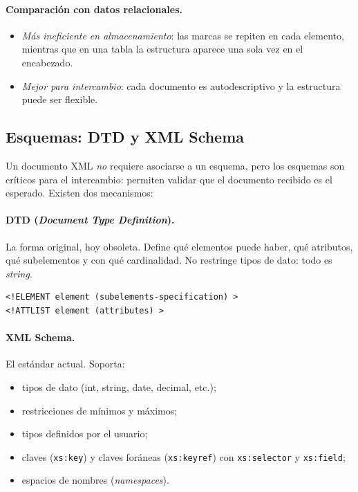 \documentclass[11pt,a4paper]{article}
\begin{document}
\paragraph{Comparación con datos relacionales.}
\begin{itemize}
    \item \emph{Más ineficiente en almacenamiento}: las marcas se repiten
    en cada elemento, mientras que en una tabla la estructura aparece
    una sola vez en el encabezado.
    \item \emph{Mejor para intercambio}: cada documento es
    autodescriptivo y la estructura puede ser flexible.
\end{itemize}

\subsection{Esquemas: DTD y XML Schema}

Un documento XML \emph{no} requiere asociarse a un esquema, pero los
esquemas son críticos para el intercambio: permiten validar que el
documento recibido es el esperado. Existen dos mecanismos:

\paragraph{DTD (\emph{Document Type Definition}).} La forma original,
hoy obsoleta. Define qué elementos puede haber, qué atributos, qué
subelementos y con qué cardinalidad. No restringe tipos de dato: todo
es \emph{string}.

\begin{lstlisting}
<!ELEMENT element (subelements-specification) >
<!ATTLIST element (attributes) >
\end{lstlisting}

\paragraph{XML Schema.} El estándar actual. Soporta:
\begin{itemize}
    \item tipos de dato (int, string, date, decimal, etc.);
    \item restricciones de mínimos y máximos;
    \item tipos definidos por el usuario;
    \item claves (\texttt{xs:key}) y claves foráneas (\texttt{xs:keyref})
    con \texttt{xs:selector} y \texttt{xs:field};
    \item espacios de nombres (\emph{namespaces}).
\end{itemize}
\end{document}

